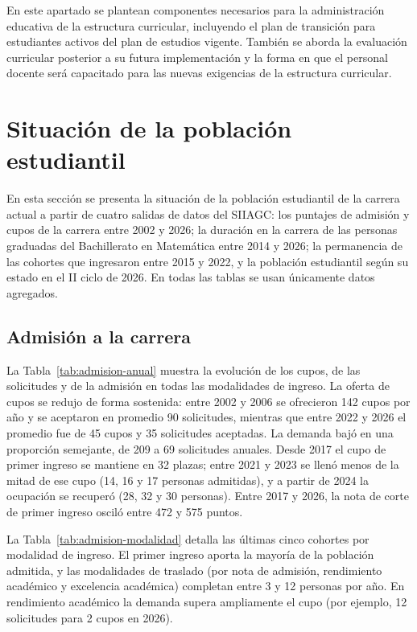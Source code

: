 En este apartado se plantean componentes necesarios para la administración educativa de la estructura curricular, incluyendo el plan de transición para estudiantes activos del plan de estudios vigente. También se aborda la evaluación curricular posterior a su futura implementación y la forma en que el personal docente será capacitado para las nuevas exigencias de la estructura curricular.

\section{Situación de la población estudiantil}
\label{sec:situacion-estudiantil}

En esta sección se presenta la situación de la población estudiantil de la carrera actual a partir de cuatro salidas de datos del SIIAGC: los puntajes de admisión y cupos de la carrera entre 2002 y 2026; la duración en la carrera de las personas graduadas del Bachillerato en Matemática entre 2014 y 2026; la permanencia de las cohortes que ingresaron entre 2015 y 2022, y la población estudiantil según su estado en el II ciclo de 2026. En todas las tablas se usan únicamente datos agregados.

\subsection{Admisión a la carrera}

La Tabla~\ref{tab:admision-anual} muestra la evolución de los cupos, de las solicitudes y de la admisión en todas las modalidades de ingreso. La oferta de cupos se redujo de forma sostenida: entre 2002 y 2006 se ofrecieron 142 cupos por año y se aceptaron en promedio 90 solicitudes, mientras que entre 2022 y 2026 el promedio fue de 45 cupos y 35 solicitudes aceptadas. La demanda bajó en una proporción semejante, de 209 a 69 solicitudes anuales. Desde 2017 el cupo de primer ingreso se mantiene en 32 plazas; entre 2021 y 2023 se llenó menos de la mitad de ese cupo (14, 16 y 17 personas admitidas), y a partir de 2024 la ocupación se recuperó (28, 32 y 30 personas). Entre 2017 y 2026, la nota de corte de primer ingreso osciló entre 472 y 575 puntos.

La Tabla~\ref{tab:admision-modalidad} detalla las últimas cinco cohortes por modalidad de ingreso. El primer ingreso aporta la mayoría de la población admitida, y las modalidades de traslado (por nota de admisión, rendimiento académico y excelencia académica) completan entre 3 y 12 personas por año. En rendimiento académico la demanda supera ampliamente el cupo (por ejemplo, 12 solicitudes para 2 cupos en 2026).

